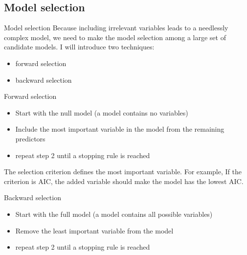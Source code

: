 \documentclass[10pt]{beamer}\usepackage[]{graphicx}\usepackage[]{xcolor}
\begin{document}

\subsection{Model selection}

\begin{frame}[fragile]{Model selection}
Because including irrelevant variables leads to a needlessly complex model, we need to make the model selection among a large set of candidate models.  
\va
I will introduce two techniques:
\begin{itemize}
\item forward selection
\item backward selection
\end{itemize}

\end{frame}

\begin{frame}[fragile]{Forward selection}
\begin{itemize}
\item Start with the null model (a model contains no variables)
\item Include the most important variable in the model from the remaining predictors 
\item repeat step 2 until a stopping rule is reached
\end{itemize}
\va
The selection criterion defines the most important variable. For example,
If the criterion is AIC, the added variable should make the model has the lowest AIC.

\end{frame}

\begin{frame}[fragile]{Backward selection}
\begin{itemize}
\item Start with the full model (a model contains all possible variables)
\item Remove the least important variable from the model
\item repeat step 2 until a stopping rule is reached
\end{itemize}
\end{frame}
\end{document}
